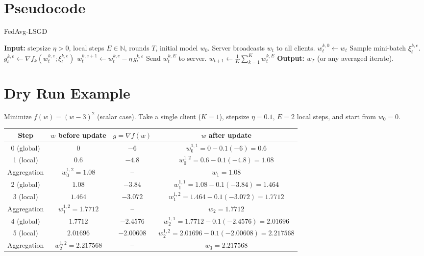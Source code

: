 \documentclass{article}
\begin{document}
\section*{Pseudocode}
\begin{algorithm}[H]
\caption{FedAvg‑LSGD}
\begin{algorithmic}[1]
\State \textbf{Input:} stepsize $\eta>0$, local steps $E\in\mathbb N$, rounds $T$, initial model $w_0$.
    \State Server broadcasts $w_t$ to all clients.
        \State $w_{t}^{k,0}\gets w_t$
            \State Sample mini‑batch $\xi_{t}^{k,e}$.
            \State $g_{t}^{k,e}\gets \nabla f_k(w_{t}^{k,e};\xi_{t}^{k,e})$
            \State $w_{t}^{k,e+1}\gets w_{t}^{k,e}-\eta\,g_{t}^{k,e}$
        \EndFor
        \State Send $w_{t}^{k,E}$ to server.
    \EndFor
    \State $w_{t+1}\gets \frac1K\sum_{k=1}^K w_{t}^{k,E}$   
\EndFor
\State \textbf{Output:} $w_T$ (or any averaged iterate).
\end{algorithmic}
\end{algorithm}

\section*{Dry Run Example}
Minimize $f(w)=(w-3)^2$ (scalar case).  
Take a single client ($K=1$), stepsize $\eta=0.1$, $E=2$ local steps, and start from $w_0=0$.

\begin{center}
\begin{tabular}{c|c|c|c}
\textbf{Step} & $w$ before update & $g=\nabla f(w)$ & $w$ after update \\ \hline
0 (global) & $0$ & $-6$ & $w_{0}^{1,1}=0-0.1(-6)=0.6$ \\ 
1 (local) & $0.6$ & $-4.8$ & $w_{0}^{1,2}=0.6-0.1(-4.8)=1.08$ \\ \hline
Aggregation & $w_{0}^{1,2}=1.08$ & – & $w_{1}=1.08$ \\ \hline
2 (global) & $1.08$ & $-3.84$ & $w_{1}^{1,1}=1.08-0.1(-3.84)=1.464$ \\ 
3 (local) & $1.464$ & $-3.072$ & $w_{1}^{1,2}=1.464-0.1(-3.072)=1.7712$ \\ \hline
Aggregation & $w_{1}^{1,2}=1.7712$ & – & $w_{2}=1.7712$ \\ \hline
4 (global) & $1.7712$ & $-2.4576$ & $w_{2}^{1,1}=1.7712-0.1(-2.4576)=2.01696$ \\ 
5 (local) & $2.01696$ & $-2.00608$ & $w_{2}^{1,2}=2.01696-0.1(-2.00608)=2.217568$ \\ \hline
Aggregation & $w_{2}^{1,2}=2.217568$ & – & $w_{3}=2.217568$
\end{tabular}
\end{center}
\end{document}
